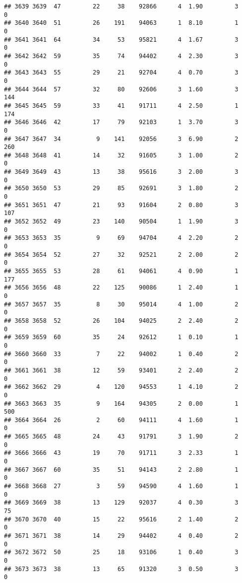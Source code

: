 \documentclass[
]{article}
\begin{document}
\begin{verbatim}
## 3639 3639  47         22     38    92866      4  1.90         3        0
## 3640 3640  51         26    191    94063      1  8.10         1        0
## 3641 3641  64         34     53    95821      4  1.67         3        0
## 3642 3642  59         35     74    94402      4  2.30         3        0
## 3643 3643  55         29     21    92704      4  0.70         3        0
## 3644 3644  57         32     80    92606      3  1.60         3      144
## 3645 3645  59         33     41    91711      4  2.50         1      174
## 3646 3646  42         17     79    92103      1  3.70         3        0
## 3647 3647  34          9    141    92056      3  6.90         2      260
## 3648 3648  41         14     32    91605      3  1.00         2        0
## 3649 3649  43         13     38    95616      3  2.00         3        0
## 3650 3650  53         29     85    92691      3  1.80         2        0
## 3651 3651  47         21     93    91604      2  0.80         3      107
## 3652 3652  49         23    140    90504      1  1.90         3        0
## 3653 3653  35          9     69    94704      4  2.20         2        0
## 3654 3654  52         27     32    92521      2  2.00         2        0
## 3655 3655  53         28     61    94061      4  0.90         1      177
## 3656 3656  48         22    125    90086      1  2.40         1        0
## 3657 3657  35          8     30    95014      4  1.00         2        0
## 3658 3658  52         26    104    94025      2  2.40         2        0
## 3659 3659  60         35     24    92612      1  0.10         1        0
## 3660 3660  33          7     22    94002      1  0.40         2        0
## 3661 3661  38         12     59    93401      2  2.40         2        0
## 3662 3662  29          4    120    94553      1  4.10         2        0
## 3663 3663  35          9    164    94305      2  0.00         1      500
## 3664 3664  26          2     60    94111      4  1.60         1        0
## 3665 3665  48         24     43    91791      3  1.90         2        0
## 3666 3666  43         19     70    91711      3  2.33         1        0
## 3667 3667  60         35     51    94143      2  2.80         1        0
## 3668 3668  27          3     59    94590      4  1.60         1        0
## 3669 3669  38         13    129    92037      4  0.30         3       75
## 3670 3670  40         15     22    95616      2  1.40         2        0
## 3671 3671  38         14     29    94402      4  0.40         2        0
## 3672 3672  50         25     18    93106      1  0.40         3        0
## 3673 3673  38         13     65    91320      3  0.50         3        0

\end{verbatim}
\end{document}
